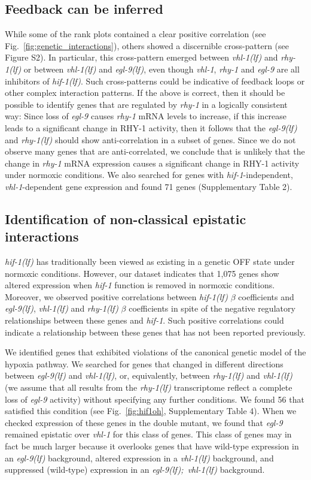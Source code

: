 \documentclass[9pt,twocolumn,twoside]{pnas-new}
\newcommand{\gene}[1]{\mbox{\emph{#1}}}
\newcommand{\egl}{\gene{egl-9(lf)}}
\newcommand{\rhy}{\gene{rhy-1(lf)}}
\newcommand{\vhl}{\gene{vhl-1(lf)}}
\newcommand{\eglvhl}{\gene{egl-9(lf); vhl-1(lf)}}
\newcommand{\hif}{\gene{hif-1(lf)}}
\newcommand{\hifn}{1,075}
\newcommand{\vhltargets}{71} %
\newcommand{\hifohtargets}{56}
\begin{document}
\subsection*{Feedback can be inferred}
\label{sub:topology}
While some of the rank plots contained a clear positive correlation (see
Fig.~\ref{fig:genetic_interactions}), others showed a discernible cross-pattern
(see Figure S2). In particular, this cross-pattern emerged between \vhl{} and
\rhy{} or between \vhl{} and \egl{}, even though \gene{vhl-1}, \gene{rhy-1} and
\gene{egl-9} are all inhibitors of \hif{}. Such cross-patterns could be
indicative of feedback loops or other complex interaction patterns. If the above
is correct, then it should be possible to identify genes that are regulated by
\gene{rhy-1} in a logically consistent way: Since loss of \gene{egl-9} causes
\gene{rhy-1} mRNA levels to increase, if this increase leads to a significant
change in RHY-1 activity, then it follows that the \egl{} and \rhy{} should show
anti-correlation in a subset of genes. Since we do not observe many genes that
are anti-correlated, we conclude that is unlikely that the change in
\gene{rhy-1} mRNA expression causes a significant change in RHY-1 activity under
normoxic conditions. We also searched for genes with \gene{hif-1}-independent,
\gene{vhl-1}-dependent gene expression and found \vhltargets{} genes
(Supplementary Table 2).

\subsection*{Identification of non-classical epistatic interactions}
\label{sub:hifoh}
\hif{} has traditionally been viewed as existing in a genetic OFF state under
normoxic conditions. However, our dataset indicates that \hifn{} genes show
altered expression when \gene{hif-1} function is removed in normoxic conditions.
Moreover, we observed positive correlations between \hif{} $\beta$ coefficients
and \egl{}, \vhl{} and \rhy{} $\beta$ coefficients in spite of the negative
regulatory relationships between these genes and \gene{hif-1}. Such positive
correlations could indicate a relationship between these genes that has not
been reported previously.

We identified genes that exhibited violations of the canonical genetic
model of the hypoxia pathway. We searched for genes that changed in different
directions between \egl{} and \vhl{}, or, equivalently, between \rhy{} and
\vhl{} (we assume that all results from the \rhy{} transcriptome reflect a
complete loss of \gene{egl-9} activity) without specifying any further
conditions. We found \hifohtargets{} that satisfied this condition (see
Fig.~\ref{fig:hif1oh}, Supplementary Table 4). When we checked expression of
these genes in the double mutant, we found that \gene{egl-9} remained epistatic
over \gene{vhl-1} for this class of genes. This class of genes may in fact be
much larger because it overlooks genes that have wild-type expression in an
\egl{} background, altered expression in a \vhl{} background, and suppressed
(wild-type) expression  in an \eglvhl{} background.
\end{document}

